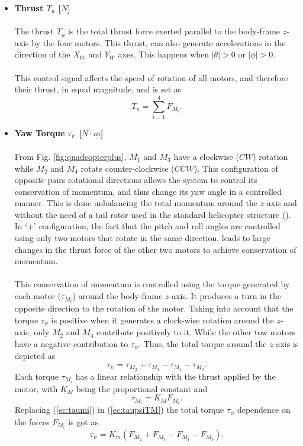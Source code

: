 \begin{itemize}
\item \textbf{Thrust $T_u$ [$N$]}\\\\
The thrust $T_u$ is the total thrust force exerted parallel to the body-frame $z$-axis by the four motors. This thrust, can also generate accelerations in the direction of the $X_W$ and $Y_W$ axes. This happens when $|\theta| > 0$ or $|\phi| > 0$.
\\\\
This control signal affects the speed of rotation of all motors, and therefore their thrust, in equal magnitude, and is set as
\begin{equation}
\label{ec:u+}
T_u = \sum_{i=1}^{4}F_{M_i}.
\end{equation}

\item \textbf{Yaw Torque $\tau_{\psi}$ [$N\cdot m$]}\\\\
From Fig. \ref{fig:quadcopterplus}, $M_1$ and $M_3$ have a clockwise ($CW$) rotation while $M_2$ and $M_4$ rotate counter-clockwise ($CCW$). This configuration of opposite pairs rotational directions allows the system to control its conservation of momentum, and thus change its yaw angle in a controlled manner. This is done unbalancing the total momentum around the $z$-axis and without the need of a tail rotor used in the standard helicopter structure (\cite{Bresciani2008}). In `+' configuration, the fact that the pitch and roll angles are controlled using only two motors that rotate in the same direction, leads to large changes in the thrust force of the other two motors to achieve conservation of momentum.
\\\\
This conservation of momentum is controlled using the torque generated by each motor ($\tau_{M_i}$) around the body-frame $z$-axis. It produces a turn in the opposite direction to the rotation of the motor. Taking into account that the torque $\tau_\psi$ is positive when it generates a clock-wise rotation around the $z$-axis, only $M_2$ and $M_4$ contribute positively to it. While the other tow motors have a negative contribution to $\tau_\psi$. Thus, the total torque around the $z$-axis is depicted as
\begin{equation}
\label{ec:taupsiTM}
\tau_{\psi} = \tau_{M_2} + \tau_{M_4} - \tau_{M_1} - \tau_{M_3}.
\end{equation}
Each torque $\tau_{M_i}$ has a linear relationship with the thrust applied by the motor, with $K_M$ being the proportional constant and
\begin{equation}
\label{ec:taumi}
\tau_{M_{i}} = K_{M}F_{M_i}.
\end{equation}
Replacing (\ref{ec:taumi}) in (\ref{ec:taupsiTM}) the total torque $\tau_\psi$ dependence on the forces $F_{M_i}$ is got as
\begin{equation}
\label{ec:taupsi+}
\tau_{\psi} = K_{m}(F_{M_2} + F_{M_4} - F_{M_1} - F_{M_3}).
\end{equation}


\end{itemize}
